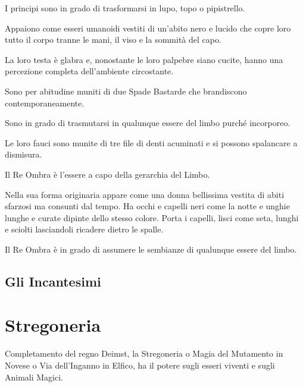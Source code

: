 I principi sono in grado di trasformarsi in lupo, topo o pipistrello.




Appaiono come esseri umanoidi vestiti di un'abito nero e
lucido che copre loro tutto il corpo tranne le mani, il viso e la
sommit\`a del capo.

La loro testa \`e glabra e, nonostante le loro palpebre siano
cucite, hanno una percezione completa dell'ambiente circostante.

Sono per abitudine muniti di due Spade Bastarde che brandiscono
contemporaneamente.

Sono in grado di trasmutarsi in qualunque essere del limbo purch\'e
incorporeo.

Le loro fauci sono munite di tre file di denti acuminati e si possono
spalancare a dismisura.


Il Re Ombra \`e l'essere a capo della gerarchia del Limbo. 

Nella sua forma originaria appare come una donna bellissima vestita di
abiti sfarzosi ma consunti dal tempo. Ha occhi e capelli neri come la
notte e unghie lunghe e curate dipinte dello stesso colore. Porta i
capelli, lisci come seta, lunghi e sciolti lasciandoli ricadere dietro
le spalle.

Il Re Ombra \`e in grado di assumere le sembianze di qualunque
essere del limbo.

\subsection{Gli Incantesimi}
\label{incnecromanzia}


\vspace{10cm}\vfill{}
\fi

\vspace{10cm}\section{Stregoneria} 


Completamento del regno Deimst, la Stregoneria o Magia del Mutamento
in Novese o Via dell'Inganno in Elfico, ha il potere sugli esseri
viventi e sugli Animali Magici.

